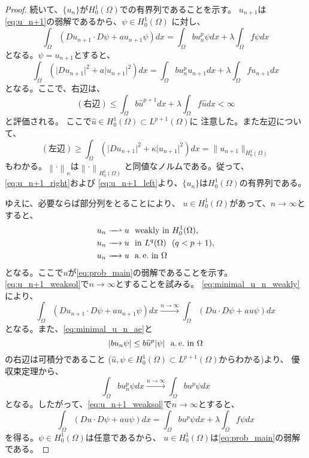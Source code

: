 \begin{proof}
 続いて、$\{u_n\}$が$H_0^1(\Omega)$での有界列であることを示す。
 $u_{n+1}$は\eqref{eq:u_n+1}の弱解であるから、$\psi \in H_0^1(\Omega)$
 に対し、
 \begin{equation}
  \int_\Omega (Du_{n+1} \cdot D\psi + a u_{n+1} \psi) dx 
   = \int_\Omega bu_n^p \psi dx + \lambda \int_\Omega f\psi dx
   \label{eq:u_n+1_weaksol}
 \end{equation}
 となる。$\psi = u_{n+1}$とすると、
 \[
 \int_\Omega (\lvert Du_{n+1} \rvert^2  + a \lvert u_{n+1} \rvert^2) dx 
 = \int_\Omega bu_n^p u_{n+1} dx + \lambda \int_\Omega f u_{n+1} dx
 \]
 となる。ここで、右辺は、
 \begin{equation}
  (\text{右辺}) \leq \int_\Omega b\hat{u}^{p+1} dx + \lambda
   \int_\Omega f \hat{u} dx < \infty \label{eq:u_n+1_right}
 \end{equation}
 と評価される。
 ここで$\hat{u} \in H_0^1(\Omega) \subset L^{p+1}(\Omega)$に
 注意した。また左辺について、
 \begin{equation}
  (\text{左辺}) \geq \int_\Omega \left( \lvert Du_{n+1} \rvert^2 + \kappa
   \lvert u_{n+1} \rvert^2 \right) dx = \| u_{n+1} \|_{H_0^1(\Omega)}
  \label{eq:u_n+1_left}
 \end{equation}
 もわかる。$\left\| \cdot \right\|_\kappa$は$\left\| \cdot
 \right\|_{H_0^1(\Omega)}$
 と同値なノルムである。従って、\eqref{eq:u_n+1_right}および
 \eqref{eq:u_n+1_left}より、$\{u_n\}$は$H_0^1(\Omega)$の有界列である。

 ゆえに、必要ならば部分列をとることにより、
 $u \in H_0^1(\Omega)$があって、$n \to \infty$とすると、
 \begin{align}
  u_n \xrightharpoonup{ \mbox{ ~ } } u & \ \ \text{weakly~} \tin
  H_0^1(\Omega), \label{eq:minimal_u_n_weakly} \\
  u_n \xrightarrow{ \mbox{ ~ } } u & \ \ \tin L^q(\Omega) \notag \ \
   (q < p+1), \\
  u_n \xrightarrow{ \mbox{ ~ } } u & \ \ \ae \tin \Omega 
    \label{eq:minimal_u_n_ae}
 \end{align}
 となる。ここで$u$が\ref{eq:prob_main}の弱解であることを示す。
 \eqref{eq:u_n+1_weaksol}で$n \to \infty$とすることを試みる。
 \eqref{eq:minimal_u_n_weakly}により、
 \[
 \int_\Omega (Du_{n+1} \cdot D\psi + a u_{n+1} \psi) dx
 \xrightarrow{n \to \infty}
 \int_\Omega (Du \cdot D\psi + a u \psi) dx
 \]
 となる。また、\eqref{eq:minimal_u_n_ae}と
 \[
  \left\lvert bu_n \psi \right\rvert \leq b \widehat{u}^p \lvert\psi\rvert \ \ \text{a.\,e.}~
 \text{in}~ \Omega
 \]
 の右辺は可積分であること
 ($\hat{u}, \psi \in H_0^1(\Omega) \subset L^{p+1}(\Omega)$からわかる)より、
 優収束定理から、
 \[
 \int_\Omega bu_n^p \psi dx \xrightarrow{n \to \infty} 
 \int_\Omega bu^p \psi dx
 \]
 となる。したがって、\eqref{eq:u_n+1_weaksol}で$n \to \infty$とすると、
 \begin{equation}
  \int_\Omega (Du \cdot D\psi + a u \psi) dx 
   = \int_\Omega bu^p \psi dx + \lambda \int_\Omega f\psi dx
   \label{eq:minimal_u_weaksol}
 \end{equation}
 を得る。$\psi \in H_0^1(\Omega)$は任意であるから、
 $u \in H_0^1(\Omega)$は\ref{eq:prob_main}の弱解である。
 

\end{proof}
